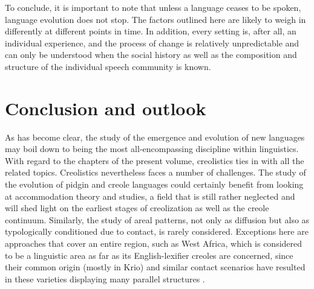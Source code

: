 \documentclass[output=paper]{langscibook}
\begin{document}
To conclude, it is important to note that unless a language ceases to be spoken, language evolution does not stop. The factors outlined here are likely to weigh in differently at different points in time. In addition, every setting is, after all, an individual experience, and the process of change is relatively unpredictable and can only be understood when the social history as well as the composition and structure of the individual speech community is known.

\section{Conclusion and outlook} \label{conclusion}

As has become clear, the study of the emergence and evolution of new languages may boil down to being the most all-encompassing discipline within linguistics. With regard to the chapters of the present volume, creolistics ties in with all the related topics. Creolistics nevertheless faces a number of challenges. The study of the evolution of pidgin and creole languages could certainly benefit from looking at accommodation theory and studies, a field that is still rather neglected and will shed light on the earliest stages of creolization as well as the creole continuum. Similarly, the study of areal patterns, not only as diffusion but also as typologically conditioned due to contact, is rarely considered. Exceptions here are approaches that cover an entire region, such as West Africa, which is considered to be a linguistic area as far as its English-lexifier creoles are concerned, since their common origin (mostly in Krio) and similar contact scenarios have resulted in these varieties displaying many parallel structures \citep{peteretal2007comparison,yakpo2017towards}.
\end{document}
